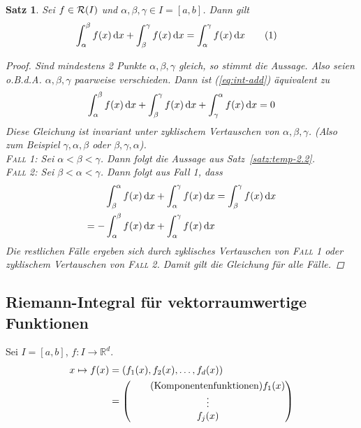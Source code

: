 \documentclass[11pt, twoside, a4paper]{article}
\theoremstyle{plain}
\newtheorem{satz}[blockelement]{Satz}
\numberwithin{equation}{subsection}
\newcommand{\numberthis}[0]{\addtocounter{equation}{1}\tag{\theequation}}
\newcommand{\pair}[1]{\left(#1\right)}
\newcommand{\of}[1]{\mathopen{}\mathclose{}\bgroup\left(#1\aftergroup\egroup\right)}
\newcommand{\interv}[1]{\left[#1\right]}
\newcommand{\fromto}{\rightarrow{}}
\newcommand{\dif}{\mathop{}\!\mathrm{d}}
\newcommand{\OBDA}{o.B.d.A. }
\newcommand{\R}{\mathbb{R}}
\newcommand{\mR}{\mathcal{R}}
\begin{document}
    \begin{satz} %
        Sei $f\in\mR\of{I}$ und $\alpha, \beta, \gamma\in I=\interv{a,b}$. Dann gilt
        \begin{align*}
            \int_{\alpha}^{\beta} f\of{x} \dif x + \int_{\beta}^{\gamma} f\of{x} \dif x &= \int_{\alpha}^{\gamma} f\of{x} \dif x\numberthis\label{eq:int-add}
        \end{align*}
        \begin{proof}
            Sind mindestens 2 Punkte $\alpha, \beta, \gamma$ gleich, so stimmt die Aussage. Also seien \OBDA $\alpha, \beta, \gamma$ paarweise verschieden. Dann ist (\ref{eq:int-add}) äquivalent zu
            \begin{align*}
                \int_{\alpha}^{\beta} f\of{x} \dif x + \int_{\beta}^{\gamma} f\of{x} \dif x + \int_{\gamma}^{\alpha} f\of{x} \dif x = 0
            \end{align*}
            Diese Gleichung ist invariant unter zyklischem Vertauschen von $\alpha, \beta, \gamma$. (Also zum Beispiel $\gamma, \alpha, \beta$ oder $\beta, \gamma, \alpha$).\\
            \textsc{Fall 1}: Sei $\alpha < \beta < \gamma$. Dann folgt die Aussage aus Satz~\ref{satz:temp-2.2}.\\[5pt]
            \textsc{Fall 2}: Sei $\beta < \alpha < \gamma$. Dann folgt aus Fall 1, dass
            \begin{align*}
                \int_{\beta}^{\alpha} f\of{x} \dif x + \int_{\alpha}^{\gamma} f\of{x} \dif x &= \int_{\beta}^{\gamma} f\of{x} \dif x\\
                = -\int_{\alpha}^{\beta} f\of{x}\dif x + \int_{\alpha}^{\gamma} f\of{x} \dif x
            \end{align*}
            Die restlichen Fälle ergeben sich durch zyklisches Vertauschen von \textsc{Fall 1} oder zyklischem Vertauschen von \textsc{Fall 2}. Damit gilt die Gleichung für alle Fälle.
        \end{proof}
    \end{satz}

    \subsection{Riemann-Integral für vektorraumwertige Funktionen}
    Sei $I=\interv{a,b}$, $f: I\fromto\R^d$.
    \begin{align*}
        x\mapsto f\of{x} &= \pair{f_1\of{x}, f_2\of{x}, \dots, f_d\of{x}}\\
        &= \begin{pmatrix}
               \tag{Komponentenfunktionen}
               f_1\of{x} \\
               \vdots    \\
               f_j\of{x}
        \end{pmatrix}
    \end{align*}
\end{document}
